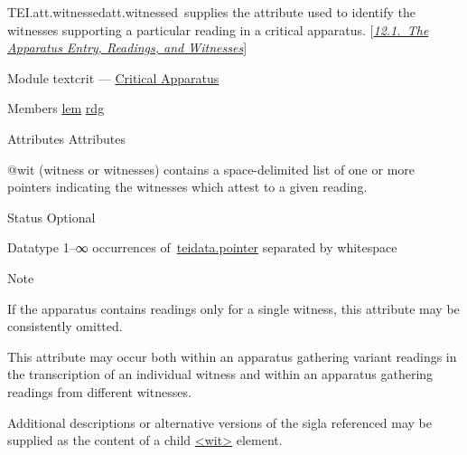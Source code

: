 \begin{reflist}
\item[]\begin{specHead}{TEI.att.witnessed}{att.witnessed} supplies the attribute used to identify the witnesses supporting a particular reading in a critical apparatus. [\textit{\hyperref[TCAPLL]{12.1.\ The Apparatus Entry, Readings, and Witnesses}}]\end{specHead} 
    \item[{Module}]
  textcrit — \hyperref[TC]{Critical Apparatus}
    \item[{Members}]
  \hyperref[TEI.lem]{lem} \hyperref[TEI.rdg]{rdg}
    \item[{Attributes}]
  Attributes\hfil\\[-10pt]\begin{sansreflist}
    \item[@wit]
  (witness or witnesses) contains a space-delimited list of one or more pointers indicating the witnesses which attest to a given reading.
\begin{reflist}
    \item[{Status}]
  Optional
    \item[{Datatype}]
  1–∞ occurrences of \hyperref[TEI.teidata.pointer]{teidata.pointer} separated by whitespace
    \item[{Note}]
  \par
If the apparatus contains readings only for a single witness, this attribute may be consistently omitted.\par
This attribute may occur both within an apparatus gathering variant readings in the transcription of an individual witness and within an apparatus gathering readings from different witnesses.\par
Additional descriptions or alternative versions of the sigla referenced may be supplied as the content of a child \hyperref[TEI.wit]{<wit>} element.
\end{reflist}  
\end{sansreflist}  
\end{reflist}  
